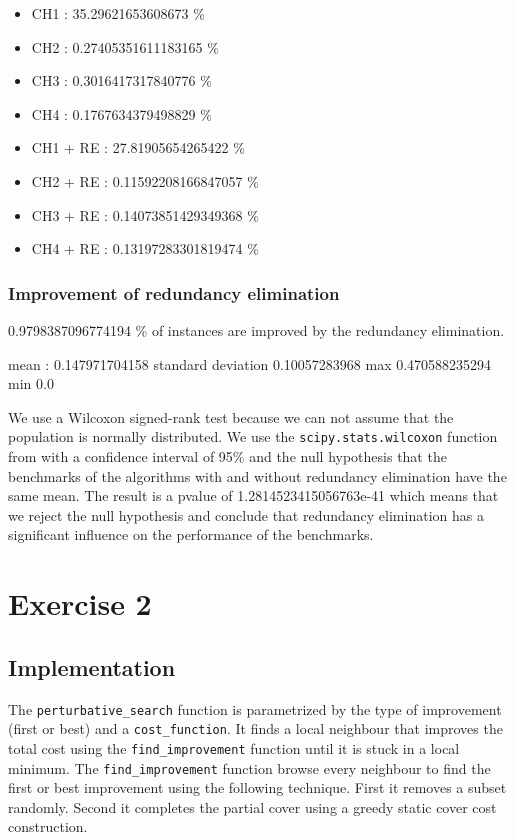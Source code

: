 \documentclass[a4paper,12pt]{article}
\begin{document}
\begin{itemize}
    \item CH1 : 35.29621653608673 \%
    \item CH2 : 0.27405351611183165 \%
    \item CH3 : 0.3016417317840776 \%
    \item CH4 : 0.1767634379498829 \%
    \item CH1 + RE : 27.81905654265422 \%
    \item CH2 + RE : 0.11592208166847057 \%
    \item CH3 + RE : 0.14073851429349368 \%
    \item CH4 + RE : 0.13197283301819474 \%
\end{itemize}

\subsubsection{Improvement of redundancy elimination}

0.9798387096774194 \% of instances are improved by the redundancy elimination.

mean : 0.147971704158
standard deviation 0.10057283968
max 0.470588235294
min 0.0

We use a Wilcoxon signed-rank test because we can not assume that the population is normally distributed. We use the \texttt{scipy.stats.wilcoxon} function from \cite{scipywilcoxon} with a confidence interval of 95\% and the null hypothesis that the benchmarks of the algorithms with and without redundancy elimination have the same mean.
The result is a pvalue of 1.2814523415056763e-41 which means that we reject the null hypothesis and conclude that redundancy elimination has a significant influence on the performance of the benchmarks.

\section{Exercise 2}

\subsection{Implementation}

The \texttt{perturbative\_search} function is parametrized by the type of improvement (first or best) and a \texttt{cost\_function}. It finds a local neighbour that improves the total cost using the \texttt{find\_improvement} function until it is stuck in a local minimum.
The \texttt{find\_improvement} function browse every neighbour to find the first or best improvement using the following technique. First it removes a subset randomly. Second it completes the partial cover using a greedy static cover cost construction.
\end{document}
